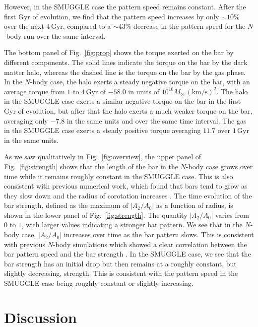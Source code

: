 \documentclass[twocolumn,linenumbers]{aastex631}
\newcommand{\Nbody}{$N$-body}
\newcommand{\SMUGGLE}{SMUGGLE}
\begin{document}
However, in the \SMUGGLE{} case the pattern speed remains constant. After the first
Gyr of evolution, we find that the pattern speed increases by only $\sim10\%$
over the next $4\,\textrm{Gyr}$, compared to a $\sim43\%$ decrease in the
pattern speed for the \Nbody{} run over the same interval.

The bottom panel of Fig.~\ref{fig:prop} shows the torque exerted on the bar by
different components. The solid lines indicate the torque on the bar by the dark
matter halo, whereas the dashed line is the torque on the bar by the gas phase.
In the \Nbody{} case, the halo exerts a steady negative torque on the bar, with
an average torque from $1$ to $4\,\textrm{Gyr}$ of $-58.0$ in units of
$10^{10}M_{\odot}\,(\textrm{km}/\textrm{s})^2$. The halo in the \SMUGGLE{} case
exerts a similar negative torque on the bar in the first Gyr of evolution, but
after that the halo exerts a much weaker torque on the bar, averaging only
$-7.8$ in the same units and over the same time interval. The gas in the \SMUGGLE{}
case exerts a steady positive torque averaging $11.7$ over $1\,\textrm{Gyr}$ in
the same units.

As we saw qualitatively in Fig.~\ref{fig:overview}, the upper panel of
Fig.~\ref{fig:strength} shows that the length of the bar in the \Nbody{} case
grows over time while it remains roughly constant in the \SMUGGLE{} case. This is
also consistent with previous numerical work, which found that bars tend to grow
as they slow down and the radius of corotation increases
\citep{2000ApJ...543..704D, 2003MNRAS.341.1179A}. The time evolution of the bar
strength, defined as the maximum of $\left|A_2/A_0\right|$ as a function of
radius, is shown in the lower panel of Fig.~\ref{fig:strength}. The quantity
$\left|A_2/A_0\right|$ varies from $0$ to $1$, with larger values indicating a
stronger bar pattern. We see that in the \Nbody{} case, $\left|A_2/A_0\right|$
increases over time as the bar pattern slows. This is consistent with previous
\Nbody{} simulations which showed a clear correlation between the bar pattern
speed and the bar strength \citep[e.g.,][]{2003MNRAS.341.1179A}. In the \SMUGGLE{}
case, we see that the bar strength has an initial drop but then remains at a
roughly constant, but slightly decreasing, strength. This is consistent with the
pattern speed in the \SMUGGLE{} case being roughly constant or slightly increasing.

\section{Discussion}
\label{sec:discussion}
\end{document}
